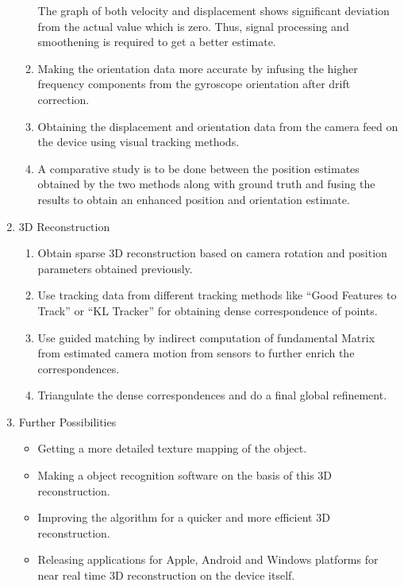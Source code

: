 \documentclass{article}
\begin{document}
\begin{enumerate}
\begin{enumerate}
					The graph of both velocity and displacement shows significant deviation from the actual value which is zero.
					Thus, signal processing and smoothening is required to get a better estimate.

				\item
					Making the orientation data more accurate by infusing the higher frequency components from the gyroscope orientation after drift correction.
				\item
					Obtaining the displacement and orientation data from the camera feed on the device using visual tracking methods.
				\item
					A comparative study is to be done between the position estimates obtained by the two methods along with ground truth and fusing the results to obtain an enhanced position and orientation estimate.
			\end{enumerate}
			\item 3D Reconstruction
			\begin{enumerate}
				\item 
					Obtain sparse 3D reconstruction based on camera rotation and position parameters obtained previously.
				\item
					Use tracking data from different tracking methods like ``Good Features to Track'' or ``KL Tracker'' for obtaining dense correspondence of points.
				\item
					Use guided matching by indirect computation of fundamental Matrix from estimated camera motion from sensors to further enrich the correspondences.
				\item
					Triangulate the dense correspondences and do a final global refinement.					
			\end{enumerate}
			\item Further Possibilities
			\begin{itemize}
			    \item Getting a more detailed texture mapping of the object.
			    \item Making a object recognition software on the basis of this 3D reconstruction.
			    \item Improving the algorithm for a quicker and more efficient 3D reconstruction. 
				\item Releasing applications for Apple, Android and Windows platforms for near real time 3D reconstruction on the device itself.
			\end{itemize}
		\end{enumerate}
\end{document}
